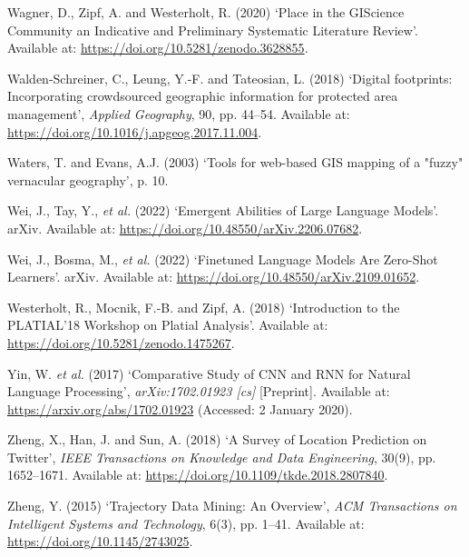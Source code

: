 \documentclass[
]{article}
\newlength{\cslhangindent}
\newenvironment{CSLReferences}[2] %
 {\begin{list}{}{%
  \setlength{\itemindent}{0pt}
  \setlength{\leftmargin}{0pt}
  \setlength{\parsep}{0pt}
  \ifodd #1
   \setlength{\leftmargin}{\cslhangindent}
   \setlength{\itemindent}{-1\cslhangindent}
  \fi
  \setlength{\itemsep}{#2\baselineskip}}}
 {\end{list}}
\begin{document}
\begin{CSLReferences}{0}{1}
Wagner, D., Zipf, A. and Westerholt, R. (2020) {`Place in the {GIScience
Community} {\textendash} an {Indicative} and {Preliminary Systematic
Literature Review}'}. Available at:
\url{https://doi.org/10.5281/zenodo.3628855}.

Walden-Schreiner, C., Leung, Y.-F. and Tateosian, L. (2018) {`Digital
footprints: {Incorporating} crowdsourced geographic information for
protected area management'}, \emph{Applied Geography}, 90, pp. 44--54.
Available at: \url{https://doi.org/10.1016/j.apgeog.2017.11.004}.

Waters, T. and Evans, A.J. (2003) {`Tools for web-based {GIS} mapping of
a "fuzzy" vernacular geography'}, p. 10.

Wei, J., Tay, Y., \emph{et al.} (2022) {`Emergent {Abilities} of {Large
Language Models}'}. {arXiv}. Available at:
\url{https://doi.org/10.48550/arXiv.2206.07682}.

Wei, J., Bosma, M., \emph{et al.} (2022) {`Finetuned {Language Models
Are Zero-Shot Learners}'}. {arXiv}. Available at:
\url{https://doi.org/10.48550/arXiv.2109.01652}.

Westerholt, R., Mocnik, F.-B. and Zipf, A. (2018) {`Introduction to the
{PLATIAL}'18 {Workshop} on {Platial Analysis}'}. Available at:
\url{https://doi.org/10.5281/zenodo.1475267}.

Yin, W. \emph{et al.} (2017) {`Comparative {Study} of {CNN} and {RNN}
for {Natural Language Processing}'}, \emph{arXiv:1702.01923 {[}cs{]}}
{[}Preprint{]}. Available at: \url{https://arxiv.org/abs/1702.01923}
(Accessed: 2 January 2020).

Zheng, X., Han, J. and Sun, A. (2018) {`A {Survey} of {Location
Prediction} on {Twitter}'}, \emph{IEEE Transactions on Knowledge and
Data Engineering}, 30(9), pp. 1652--1671. Available at:
\url{https://doi.org/10.1109/tkde.2018.2807840}.

Zheng, Y. (2015) {`Trajectory {Data Mining}: {An Overview}'}, \emph{ACM
Transactions on Intelligent Systems and Technology}, 6(3), pp. 1--41.
Available at: \url{https://doi.org/10.1145/2743025}.

\end{CSLReferences}
\end{document}
